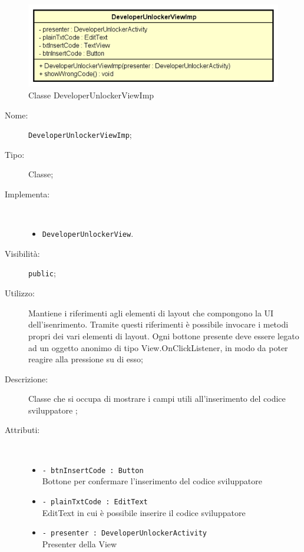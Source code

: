 \documentclass[../DefinizioneDiProdotto.tex]{subfiles}
\begin{document}
    \begin{figure}[H]
        \centering
        \includegraphics{img/DeveloperUnlockerViewImp.png}
        \caption{Classe DeveloperUnlockerViewImp}\label{fig:view::DeveloperUnlockerViewImp} 
    \end{figure}
    \begin{description}
\item[Nome:] \texttt{DeveloperUnlockerViewImp};
\item[Tipo:] Classe;
\item[Implementa:] \
\begin{itemize}
\item \texttt{DeveloperUnlockerView}.

\end{itemize}
\item[Visibilità:] \texttt{public};
\item[Utilizzo:] Mantiene i riferimenti agli elementi di layout che compongono la UI dell'isenrimento. Tramite questi riferimenti è possibile invocare i metodi propri dei vari elementi di layout. Ogni bottone presente deve essere legato ad un oggetto anonimo di tipo View.OnClickListener, in modo da poter reagire alla pressione su di esso;
\item[Descrizione:] Classe che si occupa di mostrare i campi utili all'inserimento del codice sviluppatore
;
\item[Attributi:] \
\begin{itemize}
\item \texttt{- btnInsertCode : Button}\\
Bottone per confermare l'inserimento del codice sviluppatore

\item \texttt{- plainTxtCode : EditText}\\
EditText in cui è possibile inserire il codice sviluppatore

\item \texttt{- presenter : DeveloperUnlockerActivity}\\
Presenter della View


\end{itemize}
\end{description}
\end{document}
